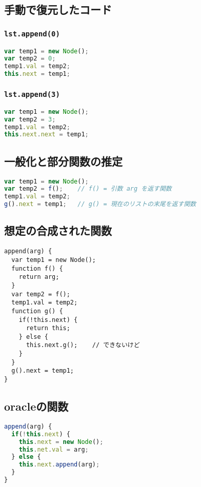 \documentclass{article}
\begin{document}
\subsection{手動で復元したコード}

\subsubsection{\texttt{lst.append(0)}}
\begin{lstlisting}[language=JavaScript]
var temp1 = new Node();
var temp2 = 0;
temp1.val = temp2;
this.next = temp1;
\end{lstlisting}

\subsubsection{\texttt{lst.append(3)}}
\begin{lstlisting}[language=JavaScript]
var temp1 = new Node();
var temp2 = 3;
temp1.val = temp2;
this.next.next = temp1;
\end{lstlisting}

\subsection{一般化と部分関数の推定}

\begin{lstlisting}[language=JavaScript]
var temp1 = new Node();
var temp2 = f();    // f() = 引数 arg を返す関数
temp1.val = temp2;
g().next = temp1;   // g() = 現在のリストの末尾を返す関数
\end{lstlisting}

\subsection{想定の合成された関数}
\begin{lstlisting}
append(arg) {
  var temp1 = new Node();
  function f() {
    return arg;
  }
  var temp2 = f();
  temp1.val = temp2;
  function g() {
    if(!this.next) {
      return this;
    } else {
      this.next.g();    // できないけど
    }
  }
  g().next = temp1;
}
\end{lstlisting}

\subsection{oracleの関数}
\begin{lstlisting}[language=JavaScript]
append(arg) {
  if(!this.next) {
    this.next = new Node();
    this.net.val = arg;
  } else {
    this.next.append(arg);
  }
}
\end{lstlisting}
\end{document}
